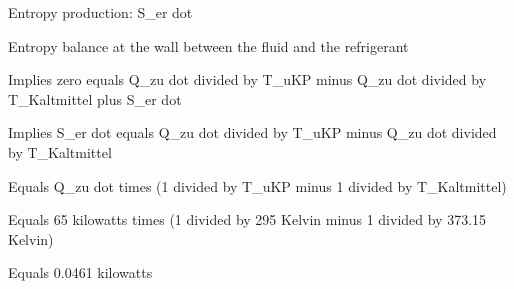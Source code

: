Entropy production: S_er dot

Entropy balance at the wall between the fluid and the refrigerant

Implies zero equals Q_zu dot divided by T_uKP minus Q_zu dot divided by T_Kaltmittel plus S_er dot

Implies S_er dot equals Q_zu dot divided by T_uKP minus Q_zu dot divided by T_Kaltmittel

Equals Q_zu dot times (1 divided by T_uKP minus 1 divided by T_Kaltmittel)

Equals 65 kilowatts times (1 divided by 295 Kelvin minus 1 divided by 373.15 Kelvin)

Equals 0.0461 kilowatts